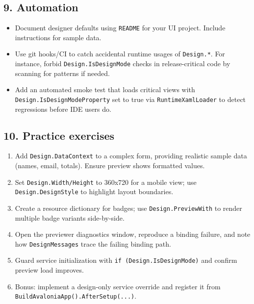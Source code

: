 \subsection{9. Automation}\label{automation}

\begin{itemize}
\tightlist
\item
  Document designer defaults using \passthrough{\lstinline!README!} for
  your UI project. Include instructions for sample data.
\item
  Use git hooks/CI to catch accidental runtime usages of
  \passthrough{\lstinline!Design.*!}. For instance, forbid
  \passthrough{\lstinline!Design.IsDesignMode!} checks in
  release-critical code by scanning for patterns if needed.
\item
  Add an automated smoke test that loads critical views with
  \passthrough{\lstinline!Design.IsDesignModeProperty!} set to true via
  \passthrough{\lstinline!RuntimeXamlLoader!} to detect regressions
  before IDE users do.
\end{itemize}

\subsection{10. Practice exercises}\label{practice-exercises-19}

\begin{enumerate}
\def\labelenumi{\arabic{enumi}.}
\tightlist
\item
  Add \passthrough{\lstinline!Design.DataContext!} to a complex form,
  providing realistic sample data (names, email, totals). Ensure preview
  shows formatted values.
\item
  Set \passthrough{\lstinline!Design.Width/Height!} to 360x720 for a
  mobile view; use \passthrough{\lstinline!Design.DesignStyle!} to
  highlight layout boundaries.
\item
  Create a resource dictionary for badges; use
  \passthrough{\lstinline!Design.PreviewWith!} to render multiple badge
  variants side-by-side.
\item
  Open the previewer diagnostics window, reproduce a binding failure,
  and note how \passthrough{\lstinline!DesignMessages!} trace the
  failing binding path.
\item
  Guard service initialization with
  \passthrough{\lstinline!if (Design.IsDesignMode)!} and confirm preview
  load improves.
\item
  Bonus: implement a design-only service override and register it from
  \passthrough{\lstinline!BuildAvaloniaApp().AfterSetup(...)!}.
\end{enumerate}

